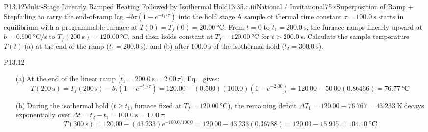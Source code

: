 \begin{problem}{P13.12}{Multi-Stage Linearly Ramped Heating Followed by Isothermal Hold}{13.3}{5.c.iii}{National / Invitational}{75 s}{Superposition of Ramp + Step}{failing to carry the end-of-ramp lag $-b\tau(1-e^{-t_1/\tau})$ into the hold stage}
A sample of thermal time constant $\tau = \SI{100.0}{\second}$ starts in equilibrium with a programmable furnace at $T(0) = T_f(0) = \SI{20.00}{\celsius}$. From $t = 0$ to $t_1 = \SI{200.0}{\second}$, the furnace ramps linearly upward at $b = \SI{0.500}{\celsius\per\second}$ to $T_f(\SI{200}{\second}) = \SI{120.00}{\celsius}$, and then holds constant at $T_f = \SI{120.00}{\celsius}$ for $t > \SI{200.0}{\second}$. Calculate the sample temperature $T(t)$ (a) at the end of the ramp ($t_1 = \SI{200.0}{\second}$), and (b) after $\SI{100.0}{\second}$ of the isothermal hold ($t_2 = \SI{300.0}{\second}$).
\end{problem}
\begin{solution}{P13.12}
\begin{enumerate}
  \item[(a)] At the end of the linear ramp ($t_1 = \SI{200.0}{\second} = 2.00\,\tau$), Eq.~ gives:
  \[
    T(\SI{200}{\second}) = T_f(\SI{200}{\second}) - b\tau\left(1 - e^{-t_1/\tau}\right) = 120.00 - (0.500)(100.0)\left(1 - e^{-2.00}\right) = 120.00 - 50.00(0.86466) = \mathbf{\SI{76.77}{\celsius}}
  \]
  \item[(b)] During the isothermal hold ($t \ge t_1$, furnace fixed at $T_f = \SI{120.00}{\celsius}$), the remaining deficit $\Delta T_1 = 120.00 - 76.767 = \SI{43.233}{\kelvin}$ decays exponentially over $\Delta t = t_2 - t_1 = \SI{100.0}{\second} = 1.00\,\tau$:
  \[
    T(\SI{300}{\second}) = 120.00 - (43.233)e^{-100.0/100.0} = 120.00 - 43.233(0.36788) = 120.00 - 15.905 = \mathbf{\SI{104.10}{\celsius}}
  \]
\end{enumerate}
\end{solution}


